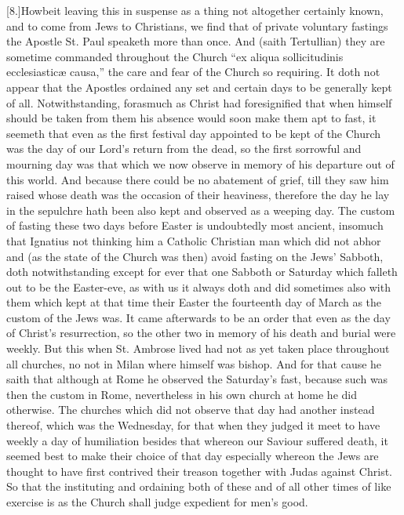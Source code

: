 [8.]Howbeit leaving this in suspense as a thing not altogether certainly known, and to come from Jews to Christians, we find that of private voluntary fastings the Apostle St. Paul speaketh more than once. And (saith Tertullian) they are sometime commanded throughout the Church “ex aliqua sollicitudinis ecclesiasticæ causa,” the care and fear of the Church so requiring. It doth not appear that the Apostles ordained any set and certain days to be generally kept of all. Notwithstanding, forasmuch as Christ had foresignified that when himself should be taken from them his absence would soon make them apt to fast, it seemeth that even as the first festival day appointed to be kept of the Church was the day of our Lord’s return from the dead, so the first sorrowful and mourning day was that which we now observe in memory of his departure out of this world. And because there could be  no abatement of grief, till they saw him raised whose death was the occasion of their heaviness, therefore the day he lay in the sepulchre hath been also kept and observed as a weeping day. The custom of fasting these two days before Easter is undoubtedly most ancient, insomuch that Ignatius not thinking him a Catholic Christian man which did not abhor and (as the state of the Church was then) avoid fasting on the Jews’ Sabboth, doth notwithstanding except for ever that one Sabboth or Saturday which falleth out to be the Easter-eve, as with us it always doth and did sometimes also with them which kept at that time their Easter the fourteenth day of March as the custom of the Jews was. It came afterwards to be an order that even as the day of Christ’s resurrection, so the other two in memory of his death and burial were weekly. But this when St. Ambrose lived had not as yet taken place throughout all churches, no not in Milan where himself was bishop. And for that cause he saith that although at Rome he observed the Saturday’s fast, because such was then the custom in Rome, nevertheless in his own church at home he did otherwise. The churches  which did not observe that day had another instead thereof, which was the Wednesday,
 for that when they judged it meet to have weekly a day of humiliation besides that whereon our Saviour suffered death, it seemed best to make their choice of that day especially whereon the Jews are thought to have first contrived their treason together with Judas against Christ. So that the instituting and ordaining both of these and of all other times of like exercise is as the Church shall judge expedient for men’s good.

